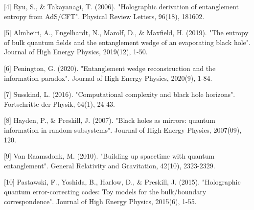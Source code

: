 \documentclass[12pt,a4paper]{article}
\begin{document}
[4] Ryu, S., & Takayanagi, T. (2006). "Holographic derivation of entanglement entropy from AdS/CFT". Physical Review Letters, 96(18), 181602.

[5] Almheiri, A., Engelhardt, N., Marolf, D., & Maxfield, H. (2019). "The entropy of bulk quantum fields and the entanglement wedge of an evaporating black hole". Journal of High Energy Physics, 2019(12), 1-50.

[6] Penington, G. (2020). "Entanglement wedge reconstruction and the information paradox". Journal of High Energy Physics, 2020(9), 1-84.

[7] Susskind, L. (2016). "Computational complexity and black hole horizons". Fortschritte der Physik, 64(1), 24-43.

[8] Hayden, P., & Preskill, J. (2007). "Black holes as mirrors: quantum information in random subsystems". Journal of High Energy Physics, 2007(09), 120.

[9] Van Raamsdonk, M. (2010). "Building up spacetime with quantum entanglement". General Relativity and Gravitation, 42(10), 2323-2329.

[10] Pastawski, F., Yoshida, B., Harlow, D., & Preskill, J. (2015). "Holographic quantum error-correcting codes: Toy models for the bulk/boundary correspondence". Journal of High Energy Physics, 2015(6), 1-55.
\end{document}
